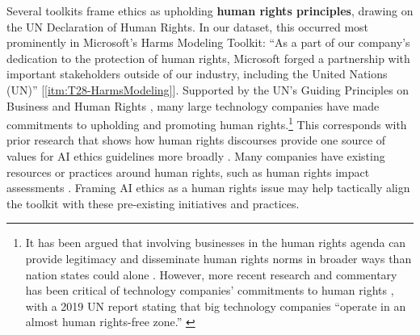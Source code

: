 \documentclass[acmsmall]{acmart}
\begin{document}
Several toolkits frame ethics as upholding \textbf{human rights principles}, drawing on the UN Declaration of Human Rights. In our dataset, this occurred most prominently in Microsoft’s Harms Modeling Toolkit: ``As a part of our company's dedication to the protection of human rights, Microsoft forged a partnership with important stakeholders outside of our industry, including the United Nations (UN)'' [\ref{itm:T28-HarmsModeling}].
Supported by the UN's Guiding Principles on Business and Human Rights \cite{UnitedNationsHumanRights2011}, many large technology companies have made commitments to upholding and promoting human rights.\footnote{It has been argued that involving businesses in the human rights agenda can provide legitimacy and disseminate human rights norms in broader ways than nation states could alone \cite{Ruggie2017SocialConstructionUN}. However, more recent research and commentary has been critical of technology companies' commitments to human rights \cite{Greene2019betterNicer}, with a 2019 UN report stating that big technology companies ``operate in an almost human rights-free zone.'' \cite{Alston2019UNReportPoverty}} 
This corresponds with prior research that shows how human rights discourses provide one source of values for AI ethics guidelines more broadly \cite{Jobin:2019bw}.  Many companies have existing resources or practices around human rights, such as human rights impact assessments \cite{metcalf2021algorithmicImpactAssessments, kemp2013humanRights}. Framing AI ethics as a human rights issue may help tactically align the toolkit with these pre-existing initiatives and practices. 


\end{document}

